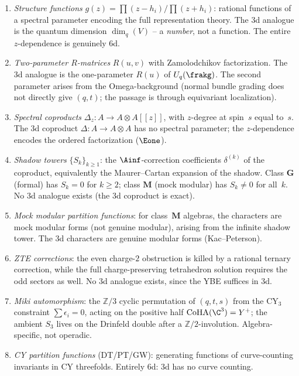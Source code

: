 \begin{enumerate}[label=\textup{(\roman*)}]
 \item \emph{Structure functions} $g(z) = \prod(z - h_i)/\prod(z + h_i)$: rational functions of a spectral parameter encoding the full representation theory. The 3d analogue is the quantum dimension $\dim_q(V)$ -- a \emph{number}, not a function. The entire $z$-dependence is genuinely 6d.
 \item \emph{Two-parameter $R$-matrices} $R(u,v)$ with Zamolodchikov factorization. The 3d analogue is the one-parameter $R(u)$ of $U_q(\frakg)$. The second parameter arises from the Omega-background (normal bundle grading does not directly give $(q,t)$; the passage is through equivariant localization).
 \item \emph{Spectral coproducts} $\Delta_z \colon A \to A \otimes A[\![z]\!]$, with $z$-degree at spin~$s$ equal to~$s$. The 3d coproduct $\Delta \colon A \to A \otimes A$ has no spectral parameter; the $z$-dependence encodes the ordered factorization ($\Eone$).
 \item \emph{Shadow towers} $\{S_k\}_{k \geq 1}$: the $\Ainf$-correction coefficients $\delta^{(k)}$ of the coproduct, equivalently the Maurer--Cartan expansion of the shadow. Class $\mathbf{G}$ (formal) has $S_k = 0$ for $k \geq 2$; class $\mathbf{M}$ (mock modular) has $S_k \neq 0$ for all~$k$. No 3d analogue exists (the 3d coproduct is exact).
 \item \emph{Mock modular partition functions}: for class~$\mathbf{M}$ algebras, the characters are mock modular forms (not genuine modular), arising from the infinite shadow tower. The 3d characters are genuine modular forms (Kac--Peterson).
 \item \emph{ZTE corrections}: the even charge-$2$ obstruction is killed by a rational ternary correction, while the full charge-preserving tetrahedron solution requires the odd sectors as well. No 3d analogue exists, since the YBE suffices in 3d.
 \item \emph{Miki automorphism}: the $\mathbb{Z}/3$ cyclic permutation of $(q,t,s)$ from the CY$_3$ constraint $\sum\epsilon_i = 0$, acting on the positive half $\mathrm{CoHA}(\C^3) = Y^+$; the ambient $S_3$ lives on the Drinfeld double after a $\mathbb{Z}/2$-involution. Algebra-specific, not operadic.
 \item \emph{CY partition functions} (DT/PT/GW): generating functions of curve-counting invariants in CY threefolds. Entirely 6d: 3d has no curve counting.
\end{enumerate}

